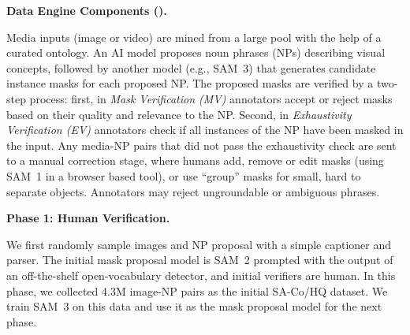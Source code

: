 \documentclass[]{fairmeta}
\newcommand{\eg}{e.g., }
\newcommand{\samone}{SAM~1\xspace}
\newcommand{\model}{SAM~3\xspace}
\newcommand{\dsname}{{SA-Co}\xspace}
\newcommand{\trainhq}{{\dsname/HQ}\xspace}
\renewcommand{\paragraph}[1]{%
	\noindent\textbf{#1.}\noindent\xspace%
}
\begin{document}
\paragraph{Data Engine Components ()}
Media inputs (image or video) are mined from a large pool with the help of a curated ontology. An AI model proposes noun phrases (NPs) describing visual concepts, followed by another model (\eg \model) that generates candidate instance masks for each proposed NP. The proposed masks are verified by a two-step process: first, in \textit{Mask Verification (MV)} annotators accept or reject masks based on their quality and relevance to the NP. Second, in \textit{Exhaustivity Verification (EV)} annotators check if all instances of the NP have been masked in the input. Any media-NP pairs that did not pass the exhaustivity check are sent to a manual correction stage, where humans add, remove or edit masks (using \samone in a browser based tool), or use ``group'' masks for small, hard to separate objects. Annotators may reject ungroundable or ambiguous phrases.



\paragraph{Phase 1: Human Verification}
We first randomly sample images and NP proposal with a simple captioner and parser. The initial mask proposal model is SAM~2 prompted with the output of an off-the-shelf open-vocabulary detector, and initial verifiers are human. In this phase, we collected 4.3M image-NP pairs as the initial \trainhq dataset. We train \model on this data and use it as the mask proposal model for the next phase.
\end{document}
